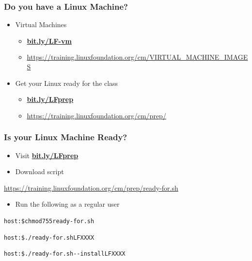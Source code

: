 \documentclass[bigger]{beamer}
\newcommand{\mycourse}{LFXXXX}
\begin{document}
\begin{frame}
	\frametitle{Do you have a Linux Machine?}
	\LARGE
	\begin{itemize} 
		\item Virtual Machines
		\begin{itemize} 
			\item {\Large\textbf{\url{bit.ly/LF-vm}}}
			\item {\small\url{https://training.linuxfoundation.org/cm/VIRTUAL_MACHINE_IMAGES}}
		\end{itemize}
		\vspace{0.5em}
		\item Get your Linux ready for the class
		\begin{itemize} 
			\item {\Large\textbf{\url{bit.ly/LFprep}}}
			\item {\small\url{https://training.linuxfoundation.org/cm/prep/}}
		\end{itemize}
	\end{itemize}
\end{frame}

\begin{frame}
	\frametitle{Is your Linux Machine Ready?}
	\LARGE
	\begin{itemize} 
		\item {\Large{}Visit \textbf{\url{bit.ly/LFprep}}}
		\vspace{0.5em}
		\item Download script
	\end{itemize}
	\vspace{-0.5em}
	{\footnotesize\url{https://training.linuxfoundation.org/cm/prep/ready-for.sh}}
	\vspace{0.5em}
	\begin{itemize} 
		\item Run the following as a regular user
	\end{itemize}
        \large
	\begin{alltt}
host:\$ chmod 755 ready-for.sh \par
host:\$ ./ready-for.sh \mycourse{} \par
host:\$ ./ready-for.sh -{}-install \mycourse{}
	\end{alltt}
\end{frame}
\end{document}
